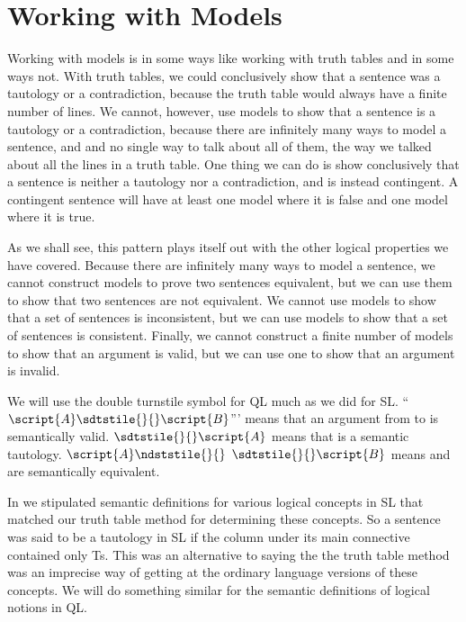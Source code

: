 \section{Working with Models}
\label{sec.UsingModels}

Working with models is in some ways like working with truth tables and in some ways not. With truth tables, we could conclusively show that a sentence was a tautology or a contradiction, because the truth table would always have a finite number of lines. We cannot, however, use models to show that a sentence is a tautology or a contradiction, because there are infinitely many ways to model a sentence, and and no single way to talk about all of them, the way we talked about all the lines in a truth table. One thing we can do is show conclusively that a sentence is neither a tautology nor a contradiction, and is instead contingent. A contingent sentence will have at least one model where it is false and one model where it is true.

As we shall see, this pattern plays itself out with the other logical properties we have covered. Because there are infinitely many ways to model a sentence, we cannot construct models to prove two sentences equivalent, but we can use them to show that two sentences are not equivalent. We cannot use models to show that a set of sentences is inconsistent, but we can use models to show that a set of sentences is consistent. Finally, we cannot construct a finite number of models to show that an argument is valid, but we can use one to show that an argument is invalid. 

We will use the double turnstile symbol for QL much as we did for SL. ``$\script{A}\sdtstile{}{} \script{B}$''' means that an argument from  to  is semantically valid.  $\sdtstile{}{} \script{A}$ means that  is a semantic tautology. $\script{A} \ndststile{}{} \hspace{.5em} \sdtstile{}{} \script{B}$ means  and  are semantically equivalent. 

In  we stipulated semantic definitions for various logical concepts in SL that matched our truth table method for determining these concepts. So a sentence was said to be a tautology in SL if the column under its main connective contained only Ts. This was an alternative to saying the the truth table method was an imprecise way of getting at the ordinary language versions of these concepts. We will do something similar for the semantic definitions of logical notions in QL. 

